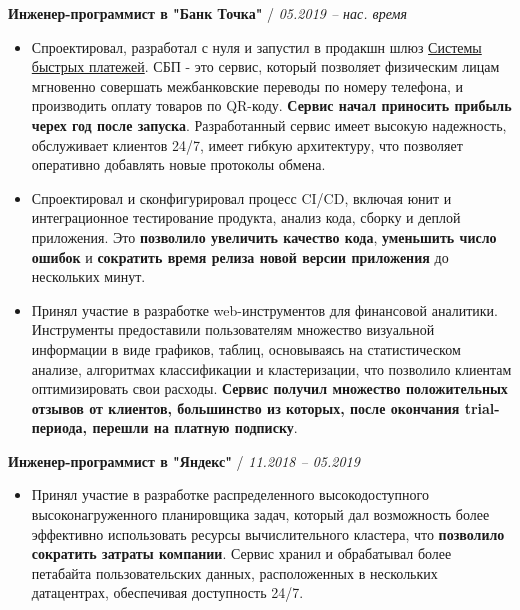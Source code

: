 \documentclass[a4paper,10pt]{article}
\newcommand{\notice}[1]{{\textcolor{dark}{\textbf{#1}}}}
\newcommand{\info}[1]{{\textcolor{darkdark}{\textbf{#1}}}}
\begin{document}
    \begin{adjustwidth}{10pt}{10pt}

        \notice{Инженер-программист в "Банк Точка"} / \textit{05.2019 – нас. время}

        \begin{itemize}

        \item Спроектировал, разработал с нуля и запустил в продакшн шлюз \href{https://sbp.nspk.ru/}{Системы быстрых платежей}. СБП - это сервис, который позволяет физическим лицам мгновенно совершать межбанковские переводы по номеру телефона, и производить оплату товаров по QR-коду. \info{Сервис начал приносить прибыль черех год после запуска}. Разработанный сервис имеет высокую надежность, обслуживает клиентов 24/7, имеет гибкую архитектуру, что позволяет оперативно добавлять новые протоколы обмена.

        \item Спроектировал и сконфигурировал процесс CI/CD, включая юнит и интеграционное тестирование продукта, анализ кода, сборку и деплой приложения. Это \info{позволило увеличить качество кода}, \info{уменьшить число ошибок} и \info{сократить время релиза новой версии приложения} до нескольких минут.

        \item Принял участие в разработке web-инструментов для финансовой аналитики. Инструменты предоставили пользователям множество визуальной информации в виде графиков, таблиц, основываясь на статистическом анализе, алгоритмах классификации и кластеризации, что позволило клиентам оптимизировать свои расходы. \info{Сервис получил множество положительных отзывов от клиентов, большинство из которых, после окончания trial-периода, перешли на платную подписку}.

        \end{itemize}


        \notice{Инженер-программист в "Яндекс"} / \textit{11.2018 – 05.2019}

        \begin{itemize}

        \item Принял участие в разработке распределенного высокодоступного высоконагруженного планировщика задач, который дал возможность более эффективно использовать ресурсы вычислительного кластера, что \info{позволило сократить затраты компании}. Сервис хранил и обрабатывал более петабайта пользовательских данных, расположенных в нескольких датацентрах, обеспечивая доступность 24/7.


\end{itemize}
\end{adjustwidth}
\end{document}
